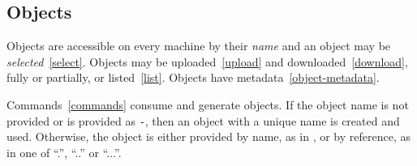 \subsection{Objects}
\label{objects}

Objects are accessible on every machine by their \emph{name} and an object may be \emph{selected}~\ref{select}. Objects may be uploaded~\ref{upload} and downloaded~\ref{download}, fully or partially, or listed~\ref{list}. Objects have metadata~\ref{object-metadata}.

Commands~\ref{commands} consume and generate objects. If the object name is not provided or is provided as \texttt{-}, then an object with a unique name is created and used. Otherwise, the object is either provided by name, as in , or by reference, as in one of ``.'', ``..'' or ``...''.
